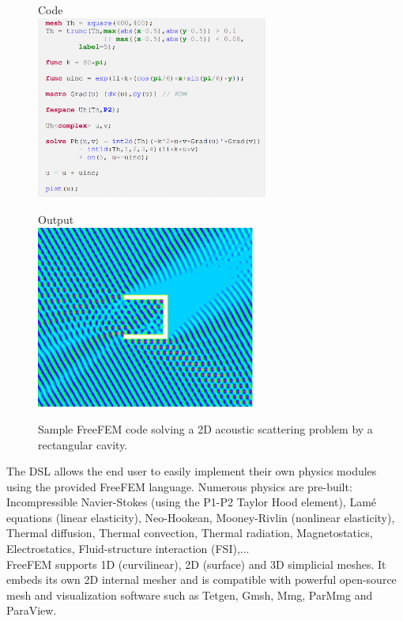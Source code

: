 \begin{figure}[h!]
\begin{minipage}{.45\textwidth}
\begin{center}
Code\\[1em]

\includegraphics[height=6cm]{graphics/freefempp/samplecode.png}\end{center}
\end{minipage}
\hfill
\begin{minipage}{.45\textwidth}
\begin{center}
Output\\[1em]

\includegraphics[height=6cm]{graphics/freefempp/sampleplot.pdf}
\end{center}
\end{minipage}
\caption{Sample FreeFEM code solving a 2D acoustic scattering problem by a rectangular cavity.}
\end{figure}

The DSL allows the end user to easily implement their own physics modules using the provided FreeFEM language. Numerous physics are pre-built: Incompressible Navier-Stokes (using the P1-P2 Taylor Hood element), Lamé equations (linear elasticity), Neo-Hookean, Mooney-Rivlin (nonlinear elasticity), Thermal diffusion, Thermal convection, Thermal radiation, Magnetostatics, Electrostatics, Fluid-structure interaction (FSI),...\\
FreeFEM supports 1D (curvilinear), 2D (surface) and 3D simplicial meshes. It embeds its own 2D internal mesher and is compatible with powerful open-source mesh and visualization software such as Tetgen, Gmsh, Mmg, ParMmg and ParaView.\\

